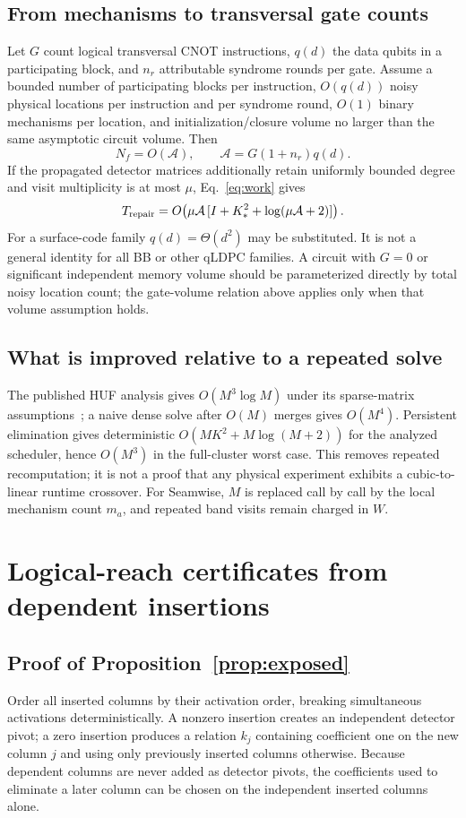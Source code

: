 \subsection{From mechanisms to transversal gate counts}
Let $G$ count logical transversal CNOT instructions, $q(d)$ the data qubits in a participating block, and $n_r$ attributable syndrome rounds per gate. Assume a bounded number of participating blocks per instruction, $O(q(d))$ noisy physical locations per instruction and per syndrome round, $O(1)$ binary mechanisms per location, and initialization/closure volume no larger than the same asymptotic circuit volume. Then
\[N_f=O(\mathcal A),\qquad\mathcal A=G(1+n_r)q(d).\]
If the propagated detector matrices additionally retain uniformly bounded degree and visit multiplicity is at most $\mu$, Eq.~\eqref{eq:work} gives
\begin{equation}
T_{\rm repair}=O\!\left(\mu\mathcal A\,[I+K_*^2+\log(\mu\mathcal A+2)]\right).\label{eq:gate}
\end{equation}
For a surface-code family $q(d)=\Theta(d^2)$ may be substituted. It is not a general identity for all BB or other qLDPC families. A circuit with $G=0$ or significant independent memory volume should be parameterized directly by total noisy location count; the gate-volume relation above applies only when that volume assumption holds.

\subsection{What is improved relative to a repeated solve}
The published HUF analysis gives $O(M^3\log M)$ under its sparse-matrix assumptions~\cite{cain}; a naive dense solve after $O(M)$ merges gives $O(M^4)$. Persistent elimination gives deterministic $O(MK^2+M\log(M+2))$ for the analyzed scheduler, hence $O(M^3)$ in the full-cluster worst case. This removes repeated recomputation; it is not a proof that any physical experiment exhibits a cubic-to-linear runtime crossover. For Seamwise, $M$ is replaced call by call by the local mechanism count $m_a$, and repeated band visits remain charged in $W$.

\section{Logical-reach certificates from dependent insertions}\label{app:reach}
\subsection{Proof of Proposition~\ref{prop:exposed}}
Order all inserted columns by their activation order, breaking simultaneous activations deterministically. A nonzero insertion creates an independent detector pivot; a zero insertion produces a relation $k_j$ containing coefficient one on the new column $j$ and using only previously inserted columns otherwise. Because dependent columns are never added as detector pivots, the coefficients used to eliminate a later column can be chosen on the independent inserted columns alone.

